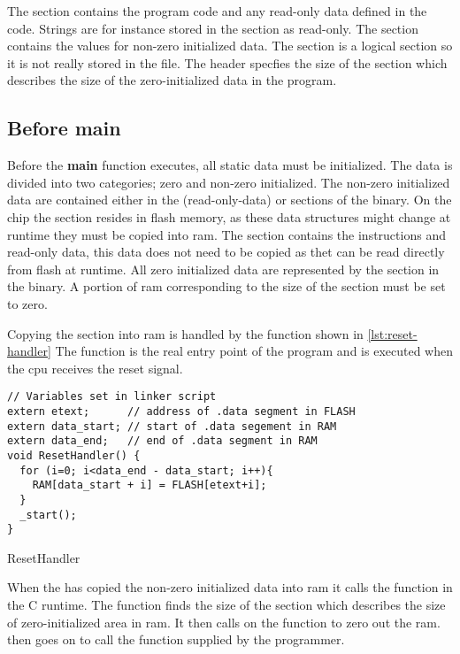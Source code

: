 The  section contains the program code and any read-only data defined in the code.
Strings are for instance stored in the  section as read-only.
The  section contains the values for non-zero initialized data.
The  section is a logical section so it is not really stored in the file.
The header specfies the size of the  section which describes the size of the zero-initialized data in the program.

\subsection{Before main}

Before the \textbf{main} function executes, all static data must be initialized.
The data is divided into two categories; zero and non-zero initialized.
The non-zero initialized data are contained either in the  (read-only-data) or  sections of the {\elf} binary.
On the chip the  section resides in flash memory, as these data structures might change at runtime they must be copied into \gls{ram}.
The  section contains the instructions and read-only data, this data does not need to be copied as thet can be read directly from flash at runtime.
All zero initialized data are represented by the  section in the {\elf} binary.
A portion of \gls{ram} corresponding to the size of the  section must be set to zero.

Copying the  section into \gls{ram} is handled by the  function shown in \autoref{lst:reset-handler}
The function is the real entry point of the program and is executed when the \gls{cpu} receives the reset signal.

\begin{listing}[H]
\begin{verbatim}
// Variables set in linker script
extern etext;      // address of .data segment in FLASH
extern data_start; // start of .data segement in RAM
extern data_end;   // end of .data segment in RAM
void ResetHandler() {
  for (i=0; i<data_end - data_start; i++){
    RAM[data_start + i] = FLASH[etext+i];
  }
  _start();
}
\end{verbatim}
\caption{ResetHandler}
\label{lst:reset-handler}
\end{listing}

When the  has copied the non-zero initialized data into \gls{ram} it calls the  function in the C runtime.
The  function finds the size of the  section which describes the size of zero-initialized area in \gls{ram}.
It then calls on the  function to zero out the \gls{ram}.
 then goes on to call the {\main} function supplied by the programmer.

